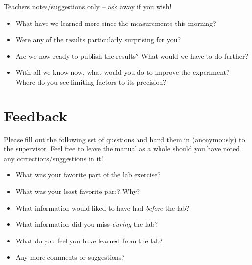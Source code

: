 \documentclass[a4,11pt, notitlepage]{article}
\begin{document}
Teachers notes/suggestions only -- ask away if you wish!

\begin{itemize}
\item What have we learned more since the measurements this morning?
\item Were any of the results particularly surprising for you?
\item Are we now ready to publish the results? What would we have to
  do further?
\item With all we know now, what would you do to improve the
  experiment? Where do you see limiting factors to its precision?
\end{itemize}

\pagebreak
\section{Feedback}
\label{sec:feedback}

Please fill out the following set of questions and hand them in
(anonymously) to the supervisor. Feel free to leave the manual as a
whole should you have noted any corrections/suggestions in it!

\begin{itemize}
\item What was your favorite part of the lab exercise?
\vspace{3cm}

\item What was your least favorite part? Why?
\vspace{3cm}

\item What information would liked to have had \emph{before} the lab?
\vspace{3cm}

\item What information did you miss \emph{during} the lab?
\vspace{3cm}

\item What do you feel you have learned from the lab?
\vspace{3cm}

\item Any more comments or suggestions?
\vspace{5cm}

\end{itemize}
\end{document}
